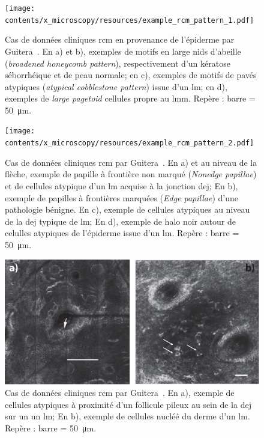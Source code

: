 \begin{figure}[H]
    \begin{center}
        \texttt{[image: contents/x\_microscopy/resources/example\_rcm\_pattern\_1.pdf]}
        \caption{Cas de données cliniques \gls{rcm} en provenance de l'épiderme par Guitera~\cite{Guitera2010}. En a) et b), exemples de motifs en large nids d'abeille (\textit{broadened honeycomb pattern}), respectivement d'un kératose séborrhéique et de peau normale; en c), exemples de motifs de pavés atypiques (\textit{atypical cobblestone pattern}) issue d'un \gls{lm}; en d), exemples de \textit{large pagetoid} cellules propre au \gls{lmm}. Repère : barre = \SI{50}{\micro\metre}.}
        \label{fig:example_rcm_pattern_1}
    \end{center} 
\end{figure}\par

\begin{figure}[H]
    \begin{center}
        \texttt{[image: contents/x\_microscopy/resources/example\_rcm\_pattern\_2.pdf]}
        \caption{Cas de données cliniques \gls{rcm} par Guitera~\cite{Guitera2010}. En a) et au niveau de la flèche, exemple de papille à frontière non marqué (\textit{Nonedge papillae}) et de cellules atypique d'un \gls{lm} acquise à la jonction \gls{dej}; En b), exemple de papilles à frontières marquées (\textit{Edge papillae}) d'une pathologie bénigne. En c), exemple de cellules atypiques au niveau de la \gls{dej} typique de \gls{lm}; En d), exemple de halo noir autour de celulles atypiques de l'épiderme issue d'un \gls{lm}. Repère : barre = \SI{50}{\micro\metre}.}
        \label{fig:example_rcm_pattern_2}
    \end{center} 
\end{figure}\par

\begin{figure}[H]
    \begin{center}
        \includegraphics[width=0.8 \linewidth]{contents/x_microscopy/resources/example_rcm_pattern_3.pdf}
        \caption{Cas de données cliniques \gls{rcm} par Guitera~\cite{Guitera2010}. En a), exemple de cellules atypiques à proximité d'un follicule pileux au sein de la \gls{dej} sur un un \gls{lm}; En b), exemple de cellules nucléé du derme d'un \gls{lm}. Repère : barre = \SI{50}{\micro\metre}.}
        \label{fig:example_rcm_pattern_3}
    \end{center} 
\end{figure}\par

